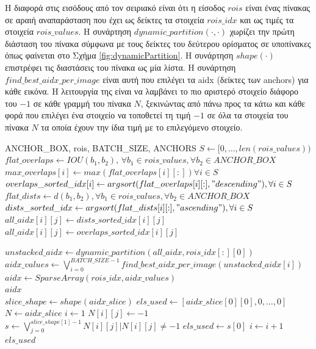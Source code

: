 \begin{algorithm}
\caption{Η διαφορά στις εισόδους από τον σειριακό είναι ότι η είσοδος $rois$ είναι ένας πίνακας σε αραιή αναπαράσταση που έχει ως δείκτες τα στοιχεία $rois\_idx$ και ως τιμές τα στοιχεία $rois\_values$. Η συνάρτηση $dynamic\_partition(\cdot,\cdot)$ χωρίζει την πρώτη διάσταση του πίνακα σύμφωνα με τους δείκτες του δεύτερου ορίσματος σε υποπίνακες όπως φαίνεται στο Σχήμα \ref{fig:dynamicPartition}. Η συνάρτηση $shape(\cdot)$ επιστρέφει τις διαστάσεις του πίνακα ως μία λίστα. Η συνάρτηση $find\_best\_aidx\_per\_image$ είναι αυτή που επιλέγει τα aidx (δείκτες των anchors) για κάθε εικόνα. Η λειτουργία της είναι να λαμβάνει το πιο αριστερό στοιχείο διάφορο του $-1$ σε κάθε γραμμή του πίνακα $N$, ξεκινώντας από πάνω προς τα κάτω και κάθε φορά που επιλέγει ένα στοιχείο να τοποθετεί τη τιμή $-1$ σε όλα τα στοιχεία του πίνακα $N$ τα οποία έχουν την ίδια τιμή με το επιλεγόμενο στοιχείο.}
\label{alg:parallel}
\begin{algorithmic}
\Require ANCHOR\_BOX, rois, BATCH\_SIZE, ANCHORS
\State $S \gets [0,\hdots, len(rois\_values))$
\State $flat\_overlaps\gets IOU(b_1, b_2),\, \forall b_1 \in rois\_values, \forall b_2 \in ANCHOR\_BOX$
\State $max\_overlaps[i]\gets max(flat\_overlaps[i][:]) \forall i \in S$
\State $overlaps\_sorted\_idx[i]\gets argsort(flat\_overlaps[i][:], "descending"), \forall i \in S$
\State $flat\_dists\gets d(b_1,b_2), \forall b_1 \in rois\_values, \forall b_2 \in ANCHOR\_BOX$
\State $dists\_sorted\_idx\gets argsort(flat\_dists[i][:], "ascending"), \forall i \in S$
\For{$i \in S, j \in [0,\hdots,ANCHORS)$}
        \State $all\_aidx[i][j]\gets dists\_sorted\_idx[i][j]$
    \Else
        \State $all\_aidx[i][j]\gets overlaps\_sorted\_idx[i][j]$
    \EndIf
\EndFor

\State $unstacked\_aidx\gets dynamic\_partition(all\_aidx, rois\_idx[:][0])$
\State $aidx\_values\gets \bigvee_{i=0}^{BATCH\_SIZE-1} find\_best\_aidx\_per\_image(unstacked\_aidx[i])$
\State $aidx\gets SparseArray(rois\_idx, aidx\_values)$\\
\Return $aidx$
\\
    \State $slice\_shape\gets shape(aidx\_slice)$
    \State $els\_used\gets [aidx\_slice[0][0], 0,\hdots,0]$
    \State $N\gets aidx\_slice$
    \State $i\gets 1$
        \For{$j \in [0,\hdots,slice\_shape[1])$}
                \State $N[i][j]\gets -1$
            \EndIf
        \EndFor
        \State $s\gets \bigvee_{j=0}^{slice\_shape[1]-1} N[i][j] | N[i][j] \neq -1$
        \State $els\_used\gets s[0]$
        \State $i\gets i+1$
    \EndWhile\\
    \Return $els\_used$    
\EndFunction
\end{algorithmic}

\end{algorithm}
